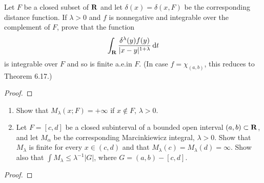 \begin{problem}
Let $F$ be a closed subset of $\mathbf{R}$ and let $\delta(x)=\delta(x,F)$ be
the corresponding distance function. If $\lambda>0$ and $f$ is nonnegative
and integrable over the complement of $F$, prove that the function
\[
\int_{\mathbf{R}}\frac{\delta^\lambda(y)f(y)}{|x-y|^{1+\lambda}}\mathop{}\!\mathrm{d}
t
\]
is integrable over $F$ and so is finite a.e.\@ in $F$. (In case
$f=\chi_{(a,b)}$, this reduces to Theorem 6.17.)
\end{problem}
\begin{proof}
\end{proof}

\begin{problem}
\begin{enumerate}[label=(\alph*)]
\item Show that $M_\lambda(x;F)=+\infty$ if $x\notin F$, $\lambda>0$.
\item Let $F=[c,d]$ be a closed subinterval of a bounded open interval
  $(a,b)\subset\mathbf{R}$, and let $M_\alpha$ be the corresponding
  Marcinkiewicz integral, $\lambda>0$. Show that $M_\lambda$ is finite for
  every $x\in(c,d)$ and that $M_\lambda(c)=M_\lambda(d)=\infty$. Show also
  that $\int M_\lambda\leq\lambda^{-1}|G|$, where $G=(a,b)-[c,d]$.
\end{enumerate}
\end{problem}
\begin{proof}
\end{proof}

